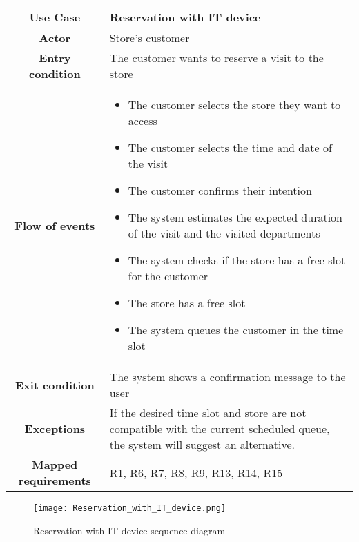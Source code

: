 \documentclass[../../main.tex]{subfiles}
\begin{document}
      \begin{table}[H]
        \centering
          \begin{tabular}{c m{}}
          \hline
          \textbf{Use Case} & Reservation with IT device\\ \hline
          \textbf{Actor} & Store's customer\\ \hline
          \textbf{Entry condition} & The customer wants to reserve a visit to the store\\  \hline
          \textbf{Flow of events} & \begin{itemize}
                                      \item The customer selects the store they want to access
                                      \item The customer selects the time and date of the visit
                                      \item The customer confirms their intention
                                      \item The system estimates the expected duration of the visit and the visited departments
                                      \item The system checks if the store has a free slot for the customer
                                      \item The store has a free slot
                                      \item The system queues the customer in the time slot
                                    \end{itemize}\\ \hline
          \textbf{Exit condition} & The system shows a confirmation message to the user \\ \hline
          \textbf{Exceptions} & If the desired time slot and store are not compatible with the current scheduled queue, the system will suggest an alternative. \\ \hline
          \textbf{Mapped requirements} & R1, R6, R7, R8, R9, R13, R14, R15\\ \hline
          \end{tabular}
      \end{table}

      \begin{figure}[H]
        \centering
        \texttt{[image: Reservation\_with\_IT\_device.png]}
        \caption{Reservation with IT device sequence diagram}
      \end{figure}
\end{document}
